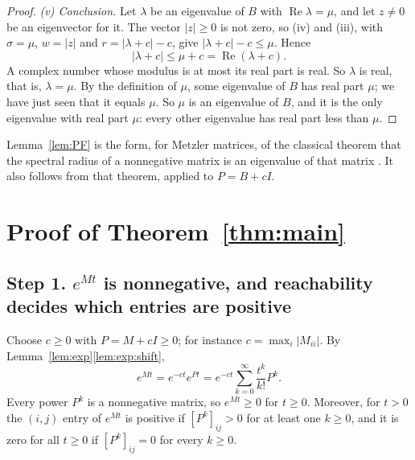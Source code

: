\documentclass[11pt]{article}
\theoremstyle{definition}
\theoremstyle{remark}
\renewcommand{\Re}{\operatorname{Re}}
\begin{document}
\begin{proof}
\emph{\textup{(v)} Conclusion.} Let $\lambda$ be an eigenvalue of $B$ with $\Re\lambda = \mu$, and
let $z \ne 0$ be an eigenvector for it. The vector $|z| \ge 0$ is not zero, so (iv) and (iii), with
$\sigma = \mu$, $w = |z|$ and $r = |\lambda + c| - c$, give $|\lambda + c| - c \le \mu$. Hence
\[
  |\lambda + c| \le \mu + c = \Re(\lambda + c) .
\]
A complex number whose modulus is at most its real part is real. So $\lambda$ is real, that is,
$\lambda = \mu$. By the definition of $\mu$, some eigenvalue of $B$ has real part $\mu$; we have
just seen that it equals $\mu$. So $\mu$ is an eigenvalue of $B$, and it is the only eigenvalue
with real part $\mu$: every other eigenvalue has real part less than $\mu$.
\end{proof}

Lemma~\ref{lem:PF} is the form, for Metzler matrices, of the classical theorem that the spectral
radius of a nonnegative matrix is an eigenvalue of that matrix
\cite[Theorem~8.3.1]{HJ}. It also follows from that theorem, applied to $P = B + cI$.

\section{Proof of Theorem~\ref{thm:main}}\label{sec:proof}

\subsection*{Step 1. $e^{Mt}$ is nonnegative, and reachability decides which entries are positive}

Choose $c \ge 0$ with $P = M + cI \ge 0$; for instance $c = \max_i |M_{ii}|$. By
Lemma~\ref{lem:exp}\ref{lem:exp:shift},
\[
  e^{Mt} = e^{-ct} e^{Pt} = e^{-ct} \sum_{k=0}^{\infty} \frac{t^{k}}{k!} P^{k} .
\]
Every power $P^k$ is a nonnegative matrix, so $e^{Mt} \ge 0$ for $t \ge 0$. Moreover, for $t > 0$
the $(i,j)$ entry of $e^{Mt}$ is positive if $[P^k]_{ij} > 0$ for at least one $k \ge 0$, and it is
zero for all $t \ge 0$ if $[P^k]_{ij} = 0$ for every $k \ge 0$.
\end{document}
